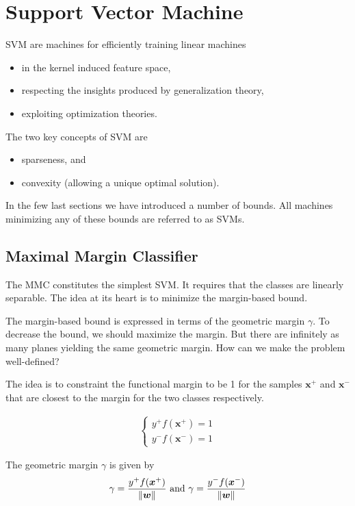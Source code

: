 \documentclass[oneside,onecolumn]{report}
\begin{document}
\section{Support Vector Machine}
SVM are machines for efficiently training linear machines
\begin{itemize}
    \item in the kernel induced feature space,
    \item respecting the insights produced by generalization theory,
    \item exploiting optimization theories.
\end{itemize}

The two key concepts of SVM are
\begin{itemize}
    \item sparseness, and
    \item convexity (allowing a unique optimal solution).
\end{itemize}

In the few last sections we have introduced a number of bounds.
All machines minimizing any of these bounds are referred to as SVMs.

\subsection{Maximal Margin Classifier}
The MMC constitutes the simplest SVM.
It requires that the classes are linearly separable.
The idea at its heart is to minimize the margin-based bound.

The margin-based bound is expressed in terms of the geometric margin $\gamma$.
To decrease the bound, we should maximize the margin.
But there are infinitely as many planes yielding the same geometric margin.
How can we make the problem well-defined?

The idea is to constraint the functional margin to be 1 for the samples $\bm x^+$ and $\bm x^-$ that are closest to the margin for the two classes respectively.

\begin{gather*}
    \begin{cases}
        y^+ f(\bm x^+) = 1 \\
        y^- f(\bm x^-) = 1
    \end{cases}
\end{gather*}

The geometric margin $\gamma$ is given by
$$ \gamma = \frac{y^+ f(\bm x^+)}{\norm{\bm w}} \text{ and } \gamma = \frac{y^- f(\bm x^-)}{\norm{\bm w}} $$
\end{document}
